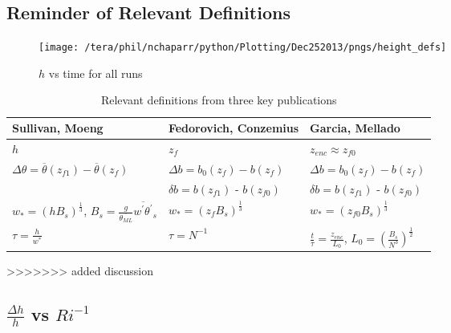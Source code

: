 \FloatBarrier

\subsection{Reminder of Relevant Definitions}
\FloatBarrier
\begin{figure}[htbp]
    \centering
    \texttt{[image: /tera/phil/nchaparr/python/Plotting/Dec252013/pngs/height\_defs]}
    \caption{$h$ vs time for all runs}
    \label{fig:hvstime}   %
\end{figure}

\begin{table}[!ht]
    \begin{center}
    \begin{tabular}{ | p{3cm} | p{3cm} | p{3cm} |}
    \hline
     Sullivan, Moeng & Fedorovich, Conzemius &  Garcia, Mellado\\ \hline
     $h$ & $z_{f}$& $z_{enc} \approx z_{f0}$ \\ \hline
     $\Delta \theta = \overline{\theta}(z_{f1})-\overline{\theta}(z_{f})$ & $\Delta b = b_{0}(z_{f}) -b(z_{f})$ & $\Delta b = b_{0}(z_{f}) - b(z_{f}) $\\ \hline
      & $\delta b = b(z_{f1})$ - $b(z_{f0})$ & $\delta b = b(z_{f1})$ - $b(z_{f0})$\\ \hline
      $w_{*}= (h B_{s})^{\frac{1}{3}}$, $B_{s} = \frac{g}{\overline{\theta_{ML}}}\overline{w^{'}\theta^{'}}_{s}$ & $w_{*}= (z_{f} B_{s})^{\frac{1}{3}}$ & $w_{*}= (z_{f0} B_{s})^{\frac{1}{3}}$\\ \hline
      $\tau = \frac{h}{w^{*}}$ & $\tau=N^{-1}$ & $\frac{t}{\tau}=\frac{z_{enc}}{L_{0}}$, $L_{0}=\left(\frac{B_{s}}{N^{3}}\right)^{\frac{1}{2}}$\\ \hline
 
   
\end{tabular}
\caption{Relevant definitions from three key publications}
\label{fig:}   
\end{center}    
\end{table}
>>>>>>> added discussion

\subsection{$\frac{\Delta h}{h}$ vs $Ri^{-1}$}
\label{subsec:deltahri}
\FloatBarrier

